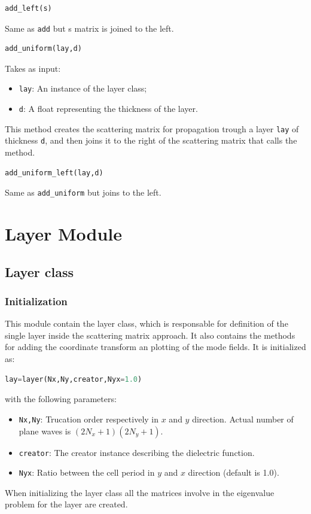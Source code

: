 \documentclass[a4paper,10pt]{report}
\begin{document}
\begin{lstlisting}[language=Python,basicstyle=\ttfamily\Large]
add_left(s)
\end{lstlisting}
Same as \texttt{add} but s matrix is joined to the left.

\begin{lstlisting}[language=Python,basicstyle=\ttfamily\Large]
add_uniform(lay,d)
\end{lstlisting}
Takes as input:
\begin{itemize}[noitemsep,topsep=0pt,parsep=0pt,partopsep=0pt]
\item \texttt{lay}: An instance of the layer class;
\item \texttt{d}: A float representing the thickness of the layer.
\end{itemize}
This method creates the scattering matrix for propagation trough a layer \texttt{lay} of thickness \texttt{d}, and then joins it to the right of the scattering matrix that calls the method.

\begin{lstlisting}[language=Python,basicstyle=\ttfamily\Large]
add_uniform_left(lay,d)
\end{lstlisting}
Same as \texttt{add\_uniform} but joins to the left.





\section{Layer Module}
\subsection{Layer class}
\subsubsection{Initialization}
This module contain the layer class, which is responsable for definition of the single layer inside the scattering matrix approach. It also contains the methods for adding the coordinate transform an plotting of the mode fields. It is initialized as: 
\begin{lstlisting}[language=Python]
lay=layer(Nx,Ny,creator,Nyx=1.0)
\end{lstlisting}
with the following parameters:
\begin{itemize}[noitemsep,topsep=0pt,parsep=0pt,partopsep=0pt]
\item \texttt{Nx,Ny}: Trucation order respectively in $x$ and $y$ direction. Actual number of plane waves is $(2N_x+1)(2N_y+1)$.
\item \texttt{creator}: The creator instance describing the dielectric function.
\item \texttt{Nyx}: Ratio between the cell period in $y$ and $x$ direction (default is 1.0).
\end{itemize}
When initializing the layer class all the matrices involve in the eigenvalue problem for the layer are created.
\end{document}
